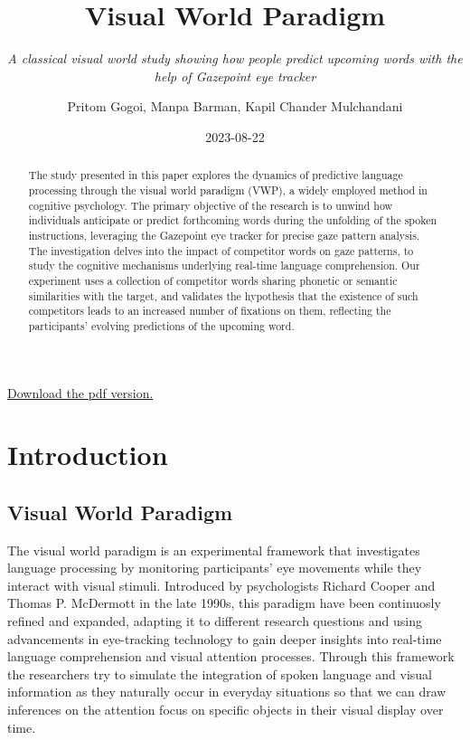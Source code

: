 \documentclass[
  a4paper,
]{article}
\title{\textbf{Visual World Paradigm}}
\subtitle{\emph{A classical visual world study showing how people
predict upcoming words with the help of Gazepoint eye tracker}}
\author{Pritom Gogoi, Manpa Barman, Kapil Chander Mulchandani}
\date{2023-08-22}
\renewcommand*\contentsname{Table of contents}
\newcommand\contentsname{Table of contents}
\begin{document}
\maketitle
\begin{abstract}
The study presented in this paper explores the dynamics of predictive
language processing through the visual world paradigm (VWP), a widely
employed method in cognitive psychology. The primary objective of the
research is to unwind how individuals anticipate or predict forthcoming
words during the unfolding of the spoken instructions, leveraging the
Gazepoint eye tracker for precise gaze pattern analysis. The
investigation delves into the impact of competitor words on gaze
patterns, to study the cognitive mechanisms underlying real-time
language comprehension. Our experiment uses a collection of competitor
words sharing phonetic or semantic similarities with the target, and
validates the hypothesis that the existence of such competitors leads to
an increased number of fixations on them, reflecting the participants'
evolving predictions of the upcoming word.
\end{abstract}
\ifdefined\Shaded\renewenvironment{Shaded}{\begin{tcolorbox}[boxrule=0pt, sharp corners, borderline west={3pt}{0pt}{shadecolor}, frame hidden, interior hidden, enhanced, breakable]}{\end{tcolorbox}}\fi

\renewcommand*\contentsname{Table of contents}
{
\hypersetup{linkcolor=}
\setcounter{tocdepth}{3}
\tableofcontents
}
\href{report/docs/report.pdf}{Download the pdf version.}

\hypertarget{introduction}{%
\section{Introduction}\label{introduction}}

\hypertarget{visual-world-paradigm}{%
\subsection{Visual World Paradigm}\label{visual-world-paradigm}}

The visual world paradigm is an experimental framework that investigates
language processing by monitoring participants' eye movements while they
interact with visual stimuli. Introduced by psychologists Richard Cooper
and Thomas P. McDermott in the late 1990s, this paradigm have been
continuosly refined and expanded, adapting it to different research
questions and using advancements in eye-tracking technology to gain
deeper insights into real-time language comprehension and visual
attention processes. Through this framework the researchers try to
simulate the integration of spoken language and visual information as
they naturally occur in everyday situations so that we can draw
inferences on the attention focus on specific objects in their visual
display over time.
\end{document}

